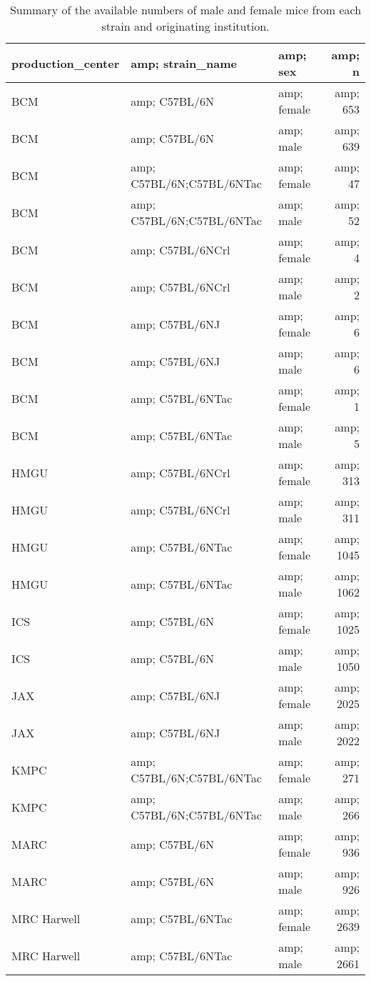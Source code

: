 \documentclass[]{article}
\begin{document}
\begin{table}

\caption{\label{tab:Table1}Summary of the available numbers of male and female mice from each strain and originating institution.}
\centering
\begin{tabular}[t]{l|l|l|r}
\hline
production\_center &amp; strain\_name &amp; sex &amp; n\\
\hline
BCM &amp; C57BL/6N &amp; female &amp; 653\\
\hline
BCM &amp; C57BL/6N &amp; male &amp; 639\\
\hline
BCM &amp; C57BL/6N;C57BL/6NTac &amp; female &amp; 47\\
\hline
BCM &amp; C57BL/6N;C57BL/6NTac &amp; male &amp; 52\\
\hline
BCM &amp; C57BL/6NCrl &amp; female &amp; 4\\
\hline
BCM &amp; C57BL/6NCrl &amp; male &amp; 2\\
\hline
BCM &amp; C57BL/6NJ &amp; female &amp; 6\\
\hline
BCM &amp; C57BL/6NJ &amp; male &amp; 6\\
\hline
BCM &amp; C57BL/6NTac &amp; female &amp; 1\\
\hline
BCM &amp; C57BL/6NTac &amp; male &amp; 5\\
\hline
HMGU &amp; C57BL/6NCrl &amp; female &amp; 313\\
\hline
HMGU &amp; C57BL/6NCrl &amp; male &amp; 311\\
\hline
HMGU &amp; C57BL/6NTac &amp; female &amp; 1045\\
\hline
HMGU &amp; C57BL/6NTac &amp; male &amp; 1062\\
\hline
ICS &amp; C57BL/6N &amp; female &amp; 1025\\
\hline
ICS &amp; C57BL/6N &amp; male &amp; 1050\\
\hline
JAX &amp; C57BL/6NJ &amp; female &amp; 2025\\
\hline
JAX &amp; C57BL/6NJ &amp; male &amp; 2022\\
\hline
KMPC &amp; C57BL/6N;C57BL/6NTac &amp; female &amp; 271\\
\hline
KMPC &amp; C57BL/6N;C57BL/6NTac &amp; male &amp; 266\\
\hline
MARC &amp; C57BL/6N &amp; female &amp; 936\\
\hline
MARC &amp; C57BL/6N &amp; male &amp; 926\\
\hline
MRC Harwell &amp; C57BL/6NTac &amp; female &amp; 2639\\
\hline
MRC Harwell &amp; C57BL/6NTac &amp; male &amp; 2661\\

\end{tabular}
\end{table}
\end{document}
